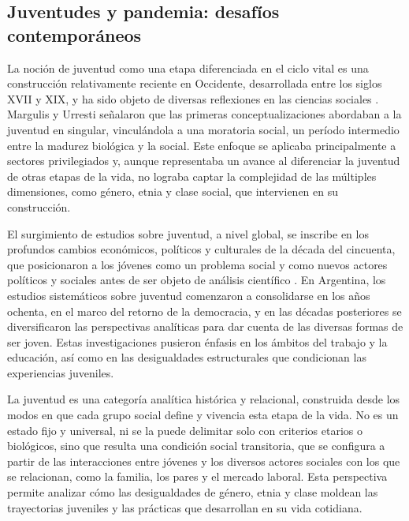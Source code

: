 \begin{refsection}
\section[Juventudes y pandemia: desafíos contemporáneos]{Juventudes y pandemia: desafíos contemporáneos}
\label{cap-26.juventudes-y-pandemia-desafios-contemporaneos}
La noción de juventud como una etapa diferenciada en el ciclo vital es una construcción relativamente reciente en Occidente, desarrollada entre los siglos XVII y XIX, y ha sido objeto de diversas reflexiones en las ciencias sociales \protect\parencite{4196-CHAVES2009}. Margulis y Urresti \protect\parencite*{4226-ANDURRESTI2008} señalaron que las primeras conceptualizaciones abordaban a la juventud en singular, vinculándola a una moratoria social, un período intermedio entre la madurez biológica y la social. Este enfoque se aplicaba principalmente a sectores privilegiados y, aunque representaba un avance al diferenciar la juventud de otras etapas de la vida, no lograba captar la complejidad de las múltiples dimensiones, como género, etnia y clase social, que intervienen en su construcción.

El surgimiento de estudios sobre juventud, a nivel global, se inscribe en los profundos cambios económicos, políticos y culturales de la década del cincuenta, que posicionaron a los jóvenes como un problema social y como nuevos actores políticos y sociales antes de ser objeto de análisis científico \protect\parencite{4196-CHAVES2009}. En Argentina, los estudios sistemáticos sobre juventud comenzaron a consolidarse en los años ochenta, en el marco del retorno de la democracia, y en las décadas posteriores se diversificaron las perspectivas analíticas para dar cuenta de las diversas formas de ser joven. Estas investigaciones pusieron énfasis en los ámbitos del trabajo y la educación, así como en las desigualdades estructurales que condicionan las experiencias juveniles.

La juventud es una categoría analítica histórica y relacional, construida desde los modos en que cada grupo social define y vivencia esta etapa de la vida. No es un estado fijo y universal, ni se la puede delimitar solo con criterios etarios o biológicos, sino que resulta una condición social transitoria, que se configura a partir de las interacciones entre jóvenes y los diversos actores sociales con los que se relacionan, como la familia, los pares y el mercado laboral. Esta perspectiva permite analizar cómo las desigualdades de género, etnia y clase moldean las trayectorias juveniles y las prácticas que desarrollan en su vida cotidiana.


\end{refsection}
